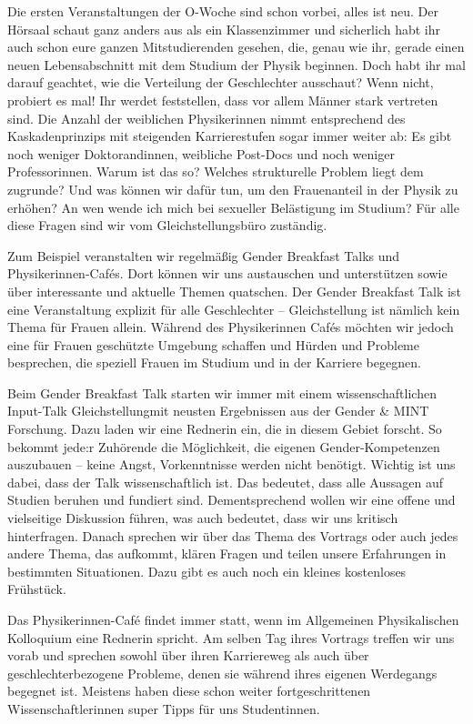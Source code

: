 \begin{multicols}{2}
Die ersten Veranstaltungen der O-Woche sind schon vorbei, alles ist neu. Der Hörsaal schaut ganz anders aus als ein Klassenzimmer und sicherlich habt ihr auch schon eure ganzen Mitstudierenden gesehen, die, genau wie ihr, gerade einen neuen Lebensabschnitt mit dem Studium der Physik beginnen. Doch habt ihr mal darauf geachtet, wie die Verteilung der Geschlechter ausschaut? Wenn nicht, probiert es mal! Ihr werdet feststellen, dass vor allem Männer stark vertreten sind. Die Anzahl der weiblichen Physikerinnen nimmt entsprechend des Kaskadenprinzips mit steigenden Karrierestufen sogar immer weiter ab: Es gibt noch weniger Doktorandinnen, weibliche Post-Docs und noch weniger Professorinnen. Warum ist das so? Welches strukturelle Problem liegt dem zugrunde? Und was können wir dafür tun, um den Frauenanteil in der Physik zu erhöhen? An wen wende ich mich bei sexueller Belästigung im Studium? Für alle diese Fragen sind wir vom Gleichstellungsbüro zuständig.

Zum Beispiel veranstalten wir regelmäßig Gender Breakfast Talks und Physikerinnen-Cafés. Dort können wir uns austauschen und unterstützen sowie über interessante und aktuelle Themen quatschen. Der Gender Breakfast Talk ist eine Veranstaltung explizit für alle Geschlechter – Gleichstellung ist nämlich kein Thema für Frauen allein. Während des Physikerinnen Cafés möchten wir jedoch eine für Frauen geschützte Umgebung schaffen und Hürden und Probleme besprechen, die speziell Frauen im Studium und in der Karriere begegnen.

Beim Gender Breakfast Talk starten wir immer mit einem wissenschaftlichen Input-Talk Gleichstellungmit neusten Ergebnissen aus der Gender \& MINT Forschung. Dazu laden wir eine Rednerin ein, die in diesem Gebiet forscht. So bekommt jede:r Zuhörende die Möglichkeit, die eigenen Gender-Kompetenzen auszubauen – keine Angst, Vorkenntnisse werden nicht benötigt. Wichtig ist uns dabei, dass der Talk wissenschaftlich ist. Das bedeutet, dass alle Aussagen auf Studien beruhen und fundiert sind. Dementsprechend wollen wir eine offene und vielseitige Diskussion führen, was auch bedeutet, dass wir uns kritisch hinterfragen. Danach sprechen wir über das Thema des Vortrags oder auch jedes andere Thema, das aufkommt, klären Fragen und teilen unsere Erfahrungen in bestimmten Situationen. Dazu gibt es auch noch ein kleines kostenloses Frühstück.

Das Physikerinnen-Café findet immer statt, wenn im Allgemeinen Physikalischen Kolloquium eine Rednerin spricht. Am selben Tag ihres Vortrags treffen wir uns vorab und sprechen sowohl über ihren Karriereweg als auch über geschlechterbezogene Probleme, denen sie während ihres eigenen Werdegangs begegnet ist. Meistens haben diese schon weiter fortgeschrittenen Wissenschaftlerinnen super Tipps für uns Studentinnen.


\end{multicols}
